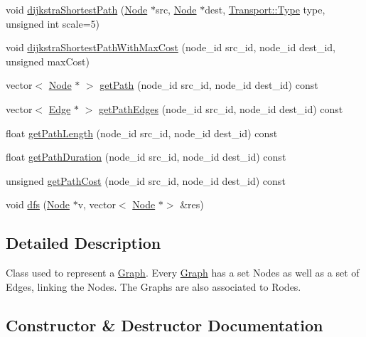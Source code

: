 \begin{DoxyCompactItemize}
\item 
void \hyperlink{class_graph_afe77f6a03cad266807c741d1a3178541}{dijkstra\+Shortest\+Path} (\hyperlink{class_node}{Node} $\ast$src, \hyperlink{class_node}{Node} $\ast$dest, \hyperlink{class_transport_a1879cecfed0d4238e5a7af6d085db317}{Transport\+::\+Type} type, unsigned int scale=5)
\item 
void \hyperlink{class_graph_a284736e6b467032dce3bfd69213c31f0}{dijkstra\+Shortest\+Path\+With\+Max\+Cost} (node\+\_\+id src\+\_\+id, node\+\_\+id dest\+\_\+id, unsigned max\+Cost)
\item 
vector$<$ \hyperlink{class_node}{Node} $\ast$ $>$ \hyperlink{class_graph_ae4c66eaf1b29f53bf90ad6266baa6819}{get\+Path} (node\+\_\+id src\+\_\+id, node\+\_\+id dest\+\_\+id) const
\item 
vector$<$ \hyperlink{class_edge}{Edge} $\ast$ $>$ \hyperlink{class_graph_a94db80dbb52cac57e2b5d14c53e649e7}{get\+Path\+Edges} (node\+\_\+id src\+\_\+id, node\+\_\+id dest\+\_\+id) const
\item 
float \hyperlink{class_graph_adb19e47c0238b012a6a3a28bdaf855f8}{get\+Path\+Length} (node\+\_\+id src\+\_\+id, node\+\_\+id dest\+\_\+id) const
\item 
float \hyperlink{class_graph_a2d69a99fb35fee10aadc243c468ad9b2}{get\+Path\+Duration} (node\+\_\+id src\+\_\+id, node\+\_\+id dest\+\_\+id) const
\item 
unsigned \hyperlink{class_graph_a9d5ab1a266d948f146e78866ef19673d}{get\+Path\+Cost} (node\+\_\+id src\+\_\+id, node\+\_\+id dest\+\_\+id) const
\item 
void \hyperlink{class_graph_ab596c4b805ecdf622c4f3d952f894a50}{dfs} (\hyperlink{class_node}{Node} $\ast$v, vector$<$ \hyperlink{class_node}{Node} $\ast$$>$ \&res)
\end{DoxyCompactItemize}


\subsection{Detailed Description}
Class used to represent a \hyperlink{class_graph}{Graph}. Every \hyperlink{class_graph}{Graph} has a set Nodes as well as a set of Edges, linking the Nodes. The Graphs are also associated to Rodes. 

\subsection{Constructor \& Destructor Documentation}
\hypertarget{class_graph_aadb341e62a5548bf406c05834aa187da}{}\label{class_graph_aadb341e62a5548bf406c05834aa187da} 
